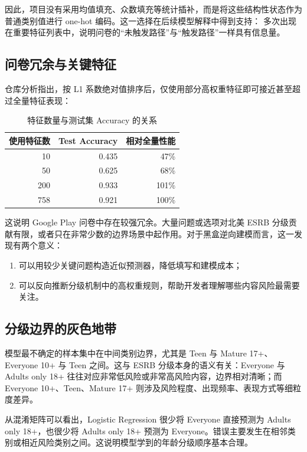 \documentclass[UTF8]{ctexart}
\newcommand{\code}[1]{\texttt{\footnotesize\detokenize{#1}}}
\begin{document}
因此，项目没有采用均值填充、众数填充等统计插补，而是将这些结构性状态作为普通类别值进行 one-hot 编码。这一选择在后续模型解释中得到支持：\code{__INACTIVE__} 多次出现在重要特征列表中，说明问卷的“未触发路径”与“触发路径”一样具有信息量。

\subsection{问卷冗余与关键特征}

仓库分析指出，按 L1 系数绝对值排序后，仅使用部分高权重特征即可接近甚至超过全量特征表现：

\begin{table}[H]
\centering
\caption{特征数量与测试集 Accuracy 的关系}
\label{tab:feature-redundancy}
\renewcommand{\arraystretch}{1.25}
\begin{tabular}{rrr}
\toprule
使用特征数 & Test Accuracy & 相对全量性能 \\
\midrule
10 & 0.435 & 47\% \\
50 & 0.625 & 68\% \\
200 & 0.933 & 101\% \\
758 & 0.921 & 100\% \\
\bottomrule
\end{tabular}
\end{table}

这说明 Google Play 问卷中存在较强冗余。大量问题或选项对北美 ESRB 分级贡献有限，或者只在非常少数的边界场景中起作用。对于黑盒逆向建模而言，这一发现有两个意义：

\begin{enumerate}[leftmargin=2em]
  \item 可以用较少关键问题构造近似预测器，降低填写和建模成本；
  \item 可以反向推断分级机制中的高权重规则，帮助开发者理解哪些内容风险最需要关注。
\end{enumerate}

\subsection{分级边界的灰色地带}

模型最不确定的样本集中在中间类别边界，尤其是 Teen 与 Mature 17+、Everyone 10+ 与 Teen 之间。这与 ESRB 分级本身的语义有关：Everyone 与 Adults only 18+ 往往对应非常低风险或非常高风险内容，边界相对清晰；而 Everyone 10+、Teen、Mature 17+ 则涉及风险程度、出现频率、表现方式等细粒度差异。

从混淆矩阵可以看出，Logistic Regression 很少将 Everyone 直接预测为 Adults only 18+，也很少将 Adults only 18+ 预测为 Everyone。错误主要发生在相邻类别或相近风险类别之间。这说明模型学到的年龄分级顺序基本合理。
\end{document}
